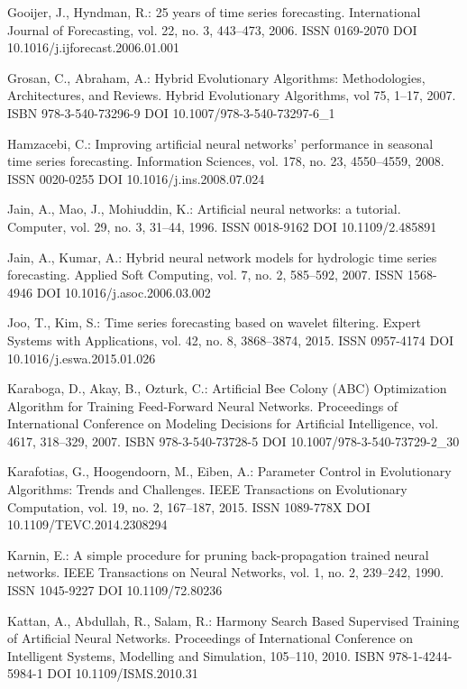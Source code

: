 \begin{thebibliography}{99.}
 Gooijer, J., Hyndman, R.: 25 years of time series forecasting. International Journal of Forecasting, vol. 22, no. 3, 443--473, 2006. ISSN 0169-2070 DOI 10.1016/j.ijforecast.2006.01.001

 Grosan, C., Abraham, A.: Hybrid Evolutionary Algorithms: Methodologies, Architectures, and Reviews. Hybrid Evolutionary Algorithms, vol 75, 1--17, 2007. ISBN 978-3-540-73296-9 DOI 10.1007/978-3-540-73297-6\_1

 Hamzacebi, C.: Improving artificial neural networks’ performance in seasonal time series forecasting. Information Sciences, vol. 178, no. 23, 4550--4559, 2008. ISSN 0020-0255 DOI 10.1016/j.ins.2008.07.024

 Jain, A., Mao, J., Mohiuddin, K.: Artificial neural networks: a tutorial. Computer, vol. 29, no. 3, 31--44, 1996. ISSN 0018-9162 DOI 10.1109/2.485891

 Jain, A., Kumar, A.: Hybrid neural network models for hydrologic time series forecasting. Applied Soft Computing, vol. 7, no. 2, 585--592, 2007. ISSN 1568-4946 DOI 10.1016/j.asoc.2006.03.002

 Joo, T., Kim, S.: Time series forecasting based on wavelet filtering. Expert Systems with Applications, vol. 42, no. 8, 3868--3874, 2015. ISSN 0957-4174 DOI 10.1016/j.eswa.2015.01.026

 Karaboga, D., Akay, B., Ozturk, C.: Artificial Bee Colony (ABC) Optimization Algorithm for Training Feed-Forward Neural Networks. Proceedings of International Conference on Modeling Decisions for Artificial Intelligence, vol. 4617, 318--329, 2007. ISBN 978-3-540-73728-5 DOI 10.1007/978-3-540-73729-2\_30

 Karafotias, G., Hoogendoorn, M., Eiben, A.: Parameter Control in Evolutionary Algorithms: Trends and Challenges. IEEE Transactions on Evolutionary Computation, vol. 19, no. 2, 167--187, 2015. ISSN 1089-778X DOI 10.1109/TEVC.2014.2308294

 Karnin, E.: A simple procedure for pruning back-propagation trained neural networks. IEEE Transactions on Neural Networks, vol. 1, no. 2, 239--242, 1990. ISSN 1045-9227 DOI 10.1109/72.80236

 Kattan, A., Abdullah, R., Salam, R.: Harmony Search Based Supervised Training of Artificial Neural Networks. Proceedings of International Conference on Intelligent Systems, Modelling and Simulation, 105--110, 2010. ISBN 978-1-4244-5984-1 DOI 10.1109/ISMS.2010.31


\end{thebibliography}
